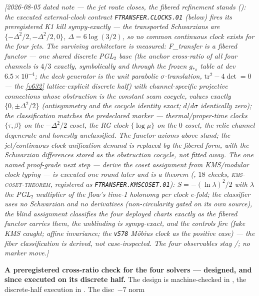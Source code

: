 \emph{[2026-08-05 dated note --- the jet route closes, the fibered refinement stands
(): the executed external-clock contract
\texttt{FTRANSFER.CLOCKS.01} (below) fires its preregistered K1 kill sympy-exactly --- the transported
Schwarzians are $\{-\Delta^2/2,-\Delta^2/2,0\}$, $\Delta=6\log(3/2)$, so \emph{no} common continuous
clock exists for the four jets.  The surviving architecture is measured: F\_transfer is a
\emph{fibered} functor --- one shared \emph{discrete} PGL$_2$ base (the anchor cross-ratio of all four
channels is $4/3$ exactly, symbolically \emph{and} through the frozen $g_{*s}$ table at dev
$6.5\times10^{-4}$; the deck generator is the unit parabolic $\sigma$-translation,
$\mathrm{tr}^2-4\det=0$ --- the \vref{v632} lattice-explicit discrete half) with channel-specific
projective connections whose obstruction is the \emph{constant} seam cocycle, values exactly
$\{0,\pm\Delta^2/2\}$ (antisymmetry and the cocycle identity exact; $d/d\sigma$ identically zero);
the classification matches the predeclared marker --- thermal/proper-time clocks $\{\tau,\beta\}$ on
the $-\Delta^2/2$ coset, the RG clock $\{\log\mu\}$ on the $0$ coset, the relic channel degenerate and
honestly unclassified.  The functor axioms above stand; the jet/continuous-clock unification demand is
\emph{replaced} by the fibered form, with the Schwarzian differences stored as the obstruction cocycle,
not fitted away.  The one named proof-grade next step --- derive the coset assignment from KMS/modular
clock typing --- is executed one round later and is a \emph{theorem}
(, $18$ checks, \textsc{kms-coset-theorem}, registered as
\texttt{FTRANSFER.KMSCOSET.01}): $S=-(\ln\lambda)^2/2$ with $\lambda$ the PGL$_2$ multiplier of the
flow's time-1 holonomy per clock e-fold; the classifier uses no Schwarzian and no derivatives
(non-circularity gated on its own source), the blind assignment classifies the four deployed charts
exactly as the fibered functor carries them, the unblinding is sympy-exact, and the controls fire
(fake KMS caught; affine invariance; the \texttt{v578} M\"obius clock as the positive case) --- the
fiber classification is derived, not case-inspected.  The four observables stay \mC/\mO; no marker
move.]}
\par\smallskip\noindent\textbf{A preregistered cross-ratio check for the four solvers ---
designed, and since executed on its discrete half.}
The design is machine-checked in , the discrete-half
execution in .  The disc~$-7$ norm
